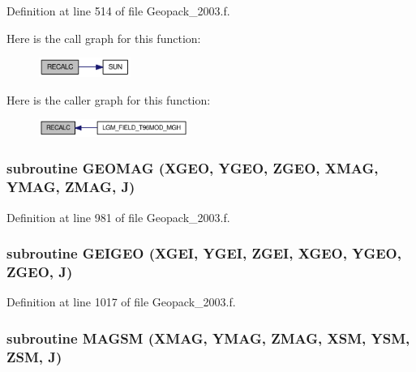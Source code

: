 Definition at line 514 of file Geopack\_\-2003.f.

Here is the call graph for this function:\nopagebreak
\begin{figure}[H]
\begin{center}
\leavevmode
\includegraphics[width=85pt]{_geopack__2003_8f_57fa81f55e16b42ac170dbf64e99a5b4_cgraph}
\end{center}
\end{figure}


Here is the caller graph for this function:\nopagebreak
\begin{figure}[H]
\begin{center}
\leavevmode
\includegraphics[width=138pt]{_geopack__2003_8f_57fa81f55e16b42ac170dbf64e99a5b4_icgraph}
\end{center}
\end{figure}
\hypertarget{_geopack__2003_8f_e0b60382c97039de9f797a776af33eb7}{
\subsubsection[{GEOMAG}]{\setlength{\rightskip}{0pt plus 5cm}subroutine GEOMAG (XGEO, \/  YGEO, \/  ZGEO, \/  XMAG, \/  YMAG, \/  ZMAG, \/  J)}}
\label{_geopack__2003_8f_e0b60382c97039de9f797a776af33eb7}




Definition at line 981 of file Geopack\_\-2003.f.\hypertarget{_geopack__2003_8f_eacac87be2a894945521bf5ef2f9ef56}{
\subsubsection[{GEIGEO}]{\setlength{\rightskip}{0pt plus 5cm}subroutine GEIGEO (XGEI, \/  YGEI, \/  ZGEI, \/  XGEO, \/  YGEO, \/  ZGEO, \/  J)}}
\label{_geopack__2003_8f_eacac87be2a894945521bf5ef2f9ef56}




Definition at line 1017 of file Geopack\_\-2003.f.\hypertarget{_geopack__2003_8f_f5577c4fb7c2ae0b88ab96b884780760}{
\subsubsection[{MAGSM}]{\setlength{\rightskip}{0pt plus 5cm}subroutine MAGSM (XMAG, \/  YMAG, \/  ZMAG, \/  XSM, \/  YSM, \/  ZSM, \/  J)}}
\label{_geopack__2003_8f_f5577c4fb7c2ae0b88ab96b884780760}




